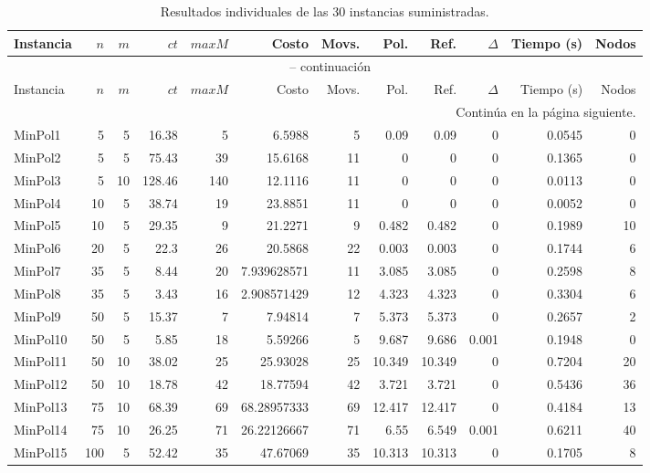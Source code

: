 \documentclass[11pt,letterpaper]{article}
\begin{document}
\begin{landscape}
\scriptsize
\setlength{\tabcolsep}{3.2pt}
\renewcommand{\arraystretch}{1.12}
\begin{longtable}{lrrrrrrrrrrr}
\caption{Resultados individuales de las 30 instancias suministradas.}
\label{tab:bateria-completa}\\
\toprule
Instancia & \(n\) & \(m\) & \(ct\) & \(maxM\) & Costo & Movs. & Pol. & Ref. & \(\Delta\) & Tiempo (s) & Nodos\\
\midrule
\endfirsthead
\multicolumn{12}{c}{\tablename\ \thetable{} -- continuación}\\
\toprule
Instancia & \(n\) & \(m\) & \(ct\) & \(maxM\) & Costo & Movs. & Pol. & Ref. & \(\Delta\) & Tiempo (s) & Nodos\\
\midrule
\endhead
\midrule
\multicolumn{12}{r}{Continúa en la página siguiente.}\\
\endfoot
\bottomrule
\endlastfoot
MinPol1 & 5 & 5 & 16.38 & 5 & 6.5988 & 5 & 0.09 & 0.09 & 0 & 0.0545 & 0\\
MinPol2 & 5 & 5 & 75.43 & 39 & 15.6168 & 11 & 0 & 0 & 0 & 0.1365 & 0\\
MinPol3 & 5 & 10 & 128.46 & 140 & 12.1116 & 11 & 0 & 0 & 0 & 0.0113 & 0\\
MinPol4 & 10 & 5 & 38.74 & 19 & 23.8851 & 11 & 0 & 0 & 0 & 0.0052 & 0\\
MinPol5 & 10 & 5 & 29.35 & 9 & 21.2271 & 9 & 0.482 & 0.482 & 0 & 0.1989 & 10\\
MinPol6 & 20 & 5 & 22.3 & 26 & 20.5868 & 22 & 0.003 & 0.003 & 0 & 0.1744 & 6\\
MinPol7 & 35 & 5 & 8.44 & 20 & 7.939628571 & 11 & 3.085 & 3.085 & 0 & 0.2598 & 8\\
MinPol8 & 35 & 5 & 3.43 & 16 & 2.908571429 & 12 & 4.323 & 4.323 & 0 & 0.3304 & 6\\
MinPol9 & 50 & 5 & 15.37 & 7 & 7.94814 & 7 & 5.373 & 5.373 & 0 & 0.2657 & 2\\
MinPol10 & 50 & 5 & 5.85 & 18 & 5.59266 & 5 & 9.687 & 9.686 & 0.001 & 0.1948 & 0\\
MinPol11 & 50 & 10 & 38.02 & 25 & 25.93028 & 25 & 10.349 & 10.349 & 0 & 0.7204 & 20\\
MinPol12 & 50 & 10 & 18.78 & 42 & 18.77594 & 42 & 3.721 & 3.721 & 0 & 0.5436 & 36\\
MinPol13 & 75 & 10 & 68.39 & 69 & 68.28957333 & 69 & 12.417 & 12.417 & 0 & 0.4184 & 13\\
MinPol14 & 75 & 10 & 26.25 & 71 & 26.22126667 & 71 & 6.55 & 6.549 & 0.001 & 0.6211 & 40\\
MinPol15 & 100 & 5 & 52.42 & 35 & 47.67069 & 35 & 10.313 & 10.313 & 0 & 0.1705 & 8\\

\end{longtable}
\end{landscape}
\end{document}
